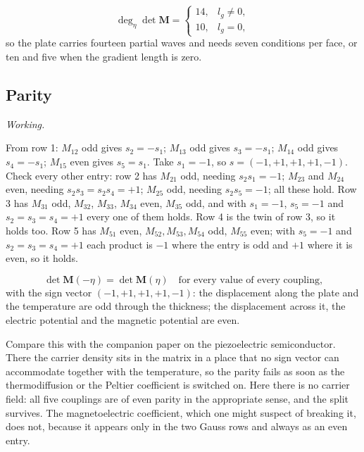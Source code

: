 \documentclass[11pt,a4paper]{article}
\newif\ifshowworked \showworkedtrue
\newenvironment{worked}{\ifshowworked\par\smallskip\noindent\textit{Working.}\par\else\setbox0\vbox\bgroup\fi}{\ifshowworked\par\smallskip\else\egroup\fi}
\begin{document}
\noindent
\begin{equation}\label{eq:deg}
\deg_\eta\det\mathbf M=\begin{cases}14,&l_g\ne0,\\10,&l_g=0,\end{cases}
\end{equation}
so the plate carries fourteen partial waves and needs seven conditions per face, or ten and five when the
gradient length is zero.

\subsection{Parity}

\begin{worked}
From row 1: $M_{12}$ odd gives $s_2=-s_1$; $M_{13}$ odd gives $s_3=-s_1$; $M_{14}$ odd gives $s_4=-s_1$;
$M_{15}$ even gives $s_5=s_1$. Take $s_1=-1$, so $s=(-1,+1,+1,+1,-1)$. Check every other entry: row 2 has
$M_{21}$ odd, needing $s_2s_1=-1$; $M_{23}$ and $M_{24}$ even, needing $s_2s_3=s_2s_4=+1$; $M_{25}$ odd,
needing $s_2s_5=-1$; all these hold. Row 3 has $M_{31}$ odd, $M_{32}$, $M_{33}$, $M_{34}$ even, $M_{35}$ odd,
and with $s_1=-1$, $s_5=-1$ and $s_2=s_3=s_4=+1$ every one of them holds. Row 4 is the twin of row 3, so it
holds too. Row 5 has $M_{51}$ even, $M_{52},M_{53},M_{54}$ odd, $M_{55}$ even; with $s_5=-1$ and
$s_2=s_3=s_4=+1$ each product is $-1$ where the entry is odd and $+1$ where it is even, so it holds.
\end{worked}

\noindent
\begin{equation}\label{eq:parity}
\det\mathbf M(-\eta)=\det\mathbf M(\eta)\quad\text{for every value of every coupling,}
\end{equation}
with the sign vector $(-1,+1,+1,+1,-1)$: the displacement along the plate and the temperature are odd
through the thickness; the displacement across it, the electric potential and the magnetic potential are
even.

Compare this with the companion paper on the piezoelectric semiconductor. There the carrier density sits in
the matrix in a place that no sign vector can accommodate together with the temperature, so the parity fails
as soon as the thermodiffusion or the Peltier coefficient is switched on. Here there is no carrier field: all
five couplings are of even parity in the appropriate sense, and the split survives. The magnetoelectric
coefficient, which one might suspect of breaking it, does not, because it appears only in the two Gauss rows
and always as an even entry.
\end{document}
